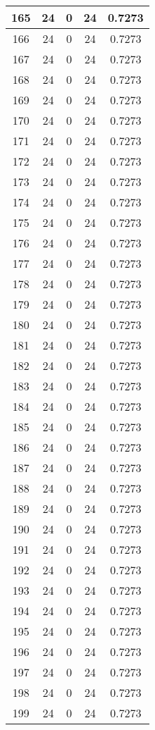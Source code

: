 \documentclass[letterpaper, 12pt]{article}
\begin{document}
\begin{longtable}{|c|c|c|c|c|}
\hline
165 & 24 & 0 & 24 & 0.7273 \\
\hline
166 & 24 & 0 & 24 & 0.7273 \\
\hline
167 & 24 & 0 & 24 & 0.7273 \\
\hline
168 & 24 & 0 & 24 & 0.7273 \\
\hline
169 & 24 & 0 & 24 & 0.7273 \\
\hline
170 & 24 & 0 & 24 & 0.7273 \\
\hline
171 & 24 & 0 & 24 & 0.7273 \\
\hline
172 & 24 & 0 & 24 & 0.7273 \\
\hline
173 & 24 & 0 & 24 & 0.7273 \\
\hline
174 & 24 & 0 & 24 & 0.7273 \\
\hline
175 & 24 & 0 & 24 & 0.7273 \\
\hline
176 & 24 & 0 & 24 & 0.7273 \\
\hline
177 & 24 & 0 & 24 & 0.7273 \\
\hline
178 & 24 & 0 & 24 & 0.7273 \\
\hline
179 & 24 & 0 & 24 & 0.7273 \\
\hline
180 & 24 & 0 & 24 & 0.7273 \\
\hline
181 & 24 & 0 & 24 & 0.7273 \\
\hline
182 & 24 & 0 & 24 & 0.7273 \\
\hline
183 & 24 & 0 & 24 & 0.7273 \\
\hline
184 & 24 & 0 & 24 & 0.7273 \\
\hline
185 & 24 & 0 & 24 & 0.7273 \\
\hline
186 & 24 & 0 & 24 & 0.7273 \\
\hline
187 & 24 & 0 & 24 & 0.7273 \\
\hline
188 & 24 & 0 & 24 & 0.7273 \\
\hline
189 & 24 & 0 & 24 & 0.7273 \\
\hline
190 & 24 & 0 & 24 & 0.7273 \\
\hline
191 & 24 & 0 & 24 & 0.7273 \\
\hline
192 & 24 & 0 & 24 & 0.7273 \\
\hline
193 & 24 & 0 & 24 & 0.7273 \\
\hline
194 & 24 & 0 & 24 & 0.7273 \\
\hline
195 & 24 & 0 & 24 & 0.7273 \\
\hline
196 & 24 & 0 & 24 & 0.7273 \\
\hline
197 & 24 & 0 & 24 & 0.7273 \\
\hline
198 & 24 & 0 & 24 & 0.7273 \\
\hline
199 & 24 & 0 & 24 & 0.7273 \\
\hline
\end{longtable}
\end{document}

